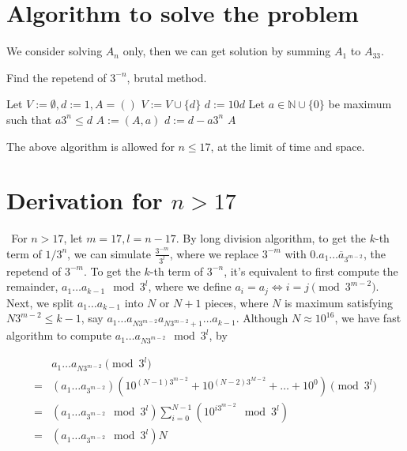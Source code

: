 \documentclass[paper=a4]{scrartcl}
\begin{document}
\section{Algorithm to solve the problem}
We consider solving $A_n$ only, then we can get solution by summing $A_1$ to $A_{33}$.
\begin{tcolorbox}[arc=0pt,colback=white,title={Algorithm}]
Find the repetend of $3^{-n}$, brutal method.
\tcblower
\begin{algorithmic}
\STATE Let $V:=\emptyset,d:=1,A=()$
	\STATE $V:=V\cup\{d\}$
    \STATE $d:=10d$
    \STATE Let $a\in\mathbb{N}\cup\{0\}$ be maximum such that $a3^n\leq d$
    \STATE $A:=(A,a)$
    \STATE $d:=d-a3^n$
\ENDWHILE 
\RETURN $A$
\end{algorithmic}
\end{tcolorbox}

The above algorithm is allowed for $n\leq 17$, at the limit of time and space.

\section{Derivation for $n>17$}

$\ \ $For $n>17$, let $m=17,l=n-17$. By long division algorithm, to get the $k$-th term of $1/3^{n}$, we can simulate $\frac{3^{-m}}{3^l}$, where we replace 
$3^{-m}$ with $0.\overline{a_1\ldots a_{3^{m-2}}}$, the repetend of $3^{-m}$. To get the $k$-th term of $3^{-n}$, it's equivalent to first compute the remainder, $a_1\ldots a_{k-1}\mod 3^l$, where we define $a_i=a_j\Leftrightarrow i=j\pmod{3^{m-2}}$. Next, we split $a_1\ldots a_{k-1}$ into $N$ or $N+1$ pieces, where $N$ is maximum satisfying $N3^{m-2}\leq k-1$, say $a_1\ldots a_{N3^{m-2}}a_{N3^{m-2}+1}\ldots a_{k-1}$. Although $N\approx 10^{16}$, we have fast algorithm to compute $a_1\ldots a_{N3^{m-2}}\mod 3^l$, by

\begin{equation}
\begin{split}
  & a_1\ldots a_{N3^{m-2}} \pmod{3^l}\\
= & (a_1\ldots a_{3^{m-2}})(10^{(N-1)3^{m-2}}+10^{(N-2)3^{M-2}}+\ldots +10^0)\pmod{3^l}\\
= & (a_1\ldots a_{3^{m-2}}\mod 3^l)\sum_{i=0}^{N-1}(10^{i3^{m-2}}\mod 3^l)\\
= & (a_1\ldots a_{3^{m-2}}\mod 3^l)N
\end{split}
\end{equation}
\end{document}
